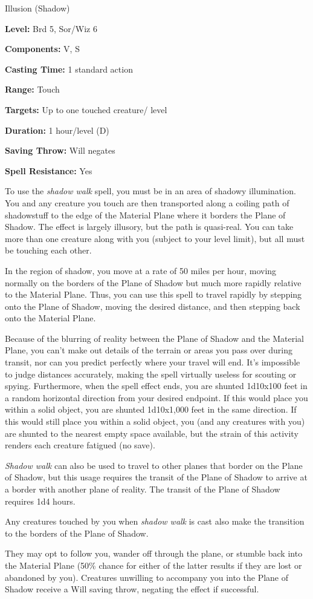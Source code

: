 
Illusion (Shadow)

\textbf{Level:} Brd 5, Sor/Wiz 6

\textbf{Components:} V, S

\textbf{Casting Time:} 1 standard action

\textbf{Range:} Touch

\textbf{Targets:} Up to one touched creature/ level

\textbf{Duration:} 1 hour/level (D)

\textbf{Saving Throw:} Will negates

\textbf{Spell Resistance:} Yes

To use the \textit{shadow walk} spell, you must be in an area of shadowy illumination. 
You and any creature you touch are then transported along a coiling path of shadowstuff 
to the edge of the Material Plane where it borders the Plane of Shadow. The effect 
is largely illusory, but the path is quasi-real. You can take more than one creature 
along with you (subject to your level limit), but all must be touching each other.

In the region of shadow, you move at a rate of 50 miles per hour, moving normally 
on the borders of the Plane of Shadow but much more rapidly relative to the Material 
Plane. Thus, you can use this spell to travel rapidly by stepping onto the Plane 
of Shadow, moving the desired distance, and then stepping back onto the Material 
Plane.

Because of the blurring of reality between the Plane of Shadow and the Material 
Plane, you can't make out details of the terrain or areas you pass over during 
transit, nor can you predict perfectly where your travel will end. It's impossible 
to judge distances accurately, making the spell virtually useless for scouting 
or spying. Furthermore, when the spell effect ends, you are shunted 1d10x100 feet 
in a random horizontal direction from your desired endpoint. If this would place 
you within a solid object, you are shunted 1d10x1,000 feet in the same direction. 
If this would still place you within a solid object, you (and any creatures with 
you) are shunted to the nearest empty space available, but the strain of this activity 
renders each creature fatigued (no save).

\textit{Shadow walk} can also be used to travel to other planes that border on 
the Plane of Shadow, but this usage requires the transit of the Plane of Shadow 
to arrive at a border with another plane of reality. The transit of the Plane of 
Shadow requires 1d4 hours.

Any creatures touched by you when \textit{shadow walk} is cast also make the transition 
to the borders of the Plane of Shadow.

They may opt to follow you, wander off through the plane, or stumble back into 
the Material Plane (50\% chance for either of the latter results if they are lost 
or abandoned by you). Creatures unwilling to accompany you into the Plane of Shadow 
receive a Will saving throw, negating the effect if successful.

